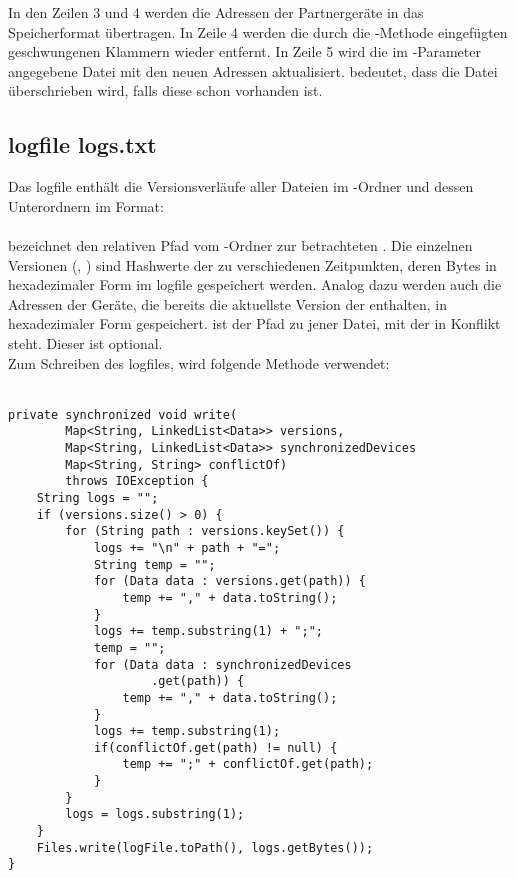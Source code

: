 In den Zeilen 3 und 4 werden die Adressen der Partnergeräte in das Speicherformat übertragen. In Zeile 4 werden die durch die -Methode  eingefügten geschwungenen Klammern wieder entfernt. In Zeile 5 wird die im -Parameter angegebene Datei mit den neuen Adressen aktualisiert.  bedeutet, dass die Datei  überschrieben wird, falls diese schon vorhanden ist.

\subsection{\gls{logfile} logs.txt}
Das \gls{logfile}   enthält die Versionsverläufe aller Dateien im \sblit-Ordner und dessen Unterordnern im Format: \\  \\
 bezeichnet den relativen Pfad vom \sblit-Ordner zur betrachteten . Die einzelnen Versionen (, ) sind Hashwerte der  zu verschiedenen Zeitpunkten, deren Bytes in hexadezimaler Form im \gls{logfile} gespeichert werden. Analog dazu werden auch die Adressen der Geräte, die bereits die aktuellste Version der  enthalten, in hexadezimaler Form gespeichert.  ist der Pfad zu jener Datei, mit der  in Konflikt steht. Dieser ist optional.\\
Zum Schreiben des \gls{logfile}s, wird folgende Methode verwendet: \\ \\
\javalisting
\begin{minipage}{\linewidth}
\begin{lstlisting}[caption={Schreiben des Logfiles \datei{logs.txt}},captionpos=b]
private synchronized void write(
		Map<String, LinkedList<Data>> versions,
		Map<String, LinkedList<Data>> synchronizedDevices
		Map<String, String> conflictOf)
		throws IOException {
	String logs = "";
	if (versions.size() > 0) {
		for (String path : versions.keySet()) {
			logs += "\n" + path + "=";
			String temp = "";
			for (Data data : versions.get(path)) {
				temp += "," + data.toString();
			}
			logs += temp.substring(1) + ";";
			temp = "";
			for (Data data : synchronizedDevices
					.get(path)) {
				temp += "," + data.toString();
			}
			logs += temp.substring(1);
			if(conflictOf.get(path) != null) {
				temp += ";" + conflictOf.get(path);
			}
		}
		logs = logs.substring(1);
	}
	Files.write(logFile.toPath(), logs.getBytes());
}
\end{lstlisting}
\end{minipage}
